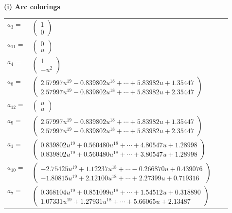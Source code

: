 \documentclass[1p]{elsarticle_modified}
\theoremstyle{definition}
\begin{document}
\flushleft \textbf{(i) Arc colorings}\\
\begin{tabular}{m{7pt} m{180pt} m{7pt} m{180pt} }
\flushright $a_{3}=$&$\begin{pmatrix}1\\0\end{pmatrix}$ \\
\flushright $a_{11}=$&$\begin{pmatrix}0\\u\end{pmatrix}$ \\
\flushright $a_{4}=$&$\begin{pmatrix}1\\- u^2\end{pmatrix}$ \\
\flushright $a_{8}=$&$\begin{pmatrix}2.57997 u^{19}-0.839802 u^{18}+\cdots+5.83982 u+1.35447\\2.57997 u^{19}-0.839802 u^{18}+\cdots+5.83982 u+2.35447\end{pmatrix}$ \\
\flushright $a_{12}=$&$\begin{pmatrix}u\\u\end{pmatrix}$ \\
\flushright $a_{9}=$&$\begin{pmatrix}2.57997 u^{19}-0.839802 u^{18}+\cdots+5.83982 u+1.35447\\2.57997 u^{19}-0.839802 u^{18}+\cdots+5.83982 u+2.35447\end{pmatrix}$ \\
\flushright $a_{1}=$&$\begin{pmatrix}0.839802 u^{19}+0.560480 u^{18}+\cdots+4.80547 u+1.28998\\0.839802 u^{19}+0.560480 u^{18}+\cdots+3.80547 u+1.28998\end{pmatrix}$ \\
\flushright $a_{10}=$&$\begin{pmatrix}-2.75425 u^{19}+1.12237 u^{18}+\cdots-0.266870 u+0.439076\\-1.80815 u^{19}+2.12100 u^{18}+\cdots+2.27399 u+0.719316\end{pmatrix}$ \\
\flushright $a_{7}=$&$\begin{pmatrix}0.368104 u^{19}+0.851099 u^{18}+\cdots+1.54512 u+0.318890\\1.07331 u^{19}+1.27931 u^{18}+\cdots+5.66065 u+2.13487\end{pmatrix}$ \\

\end{tabular}
\end{document}
